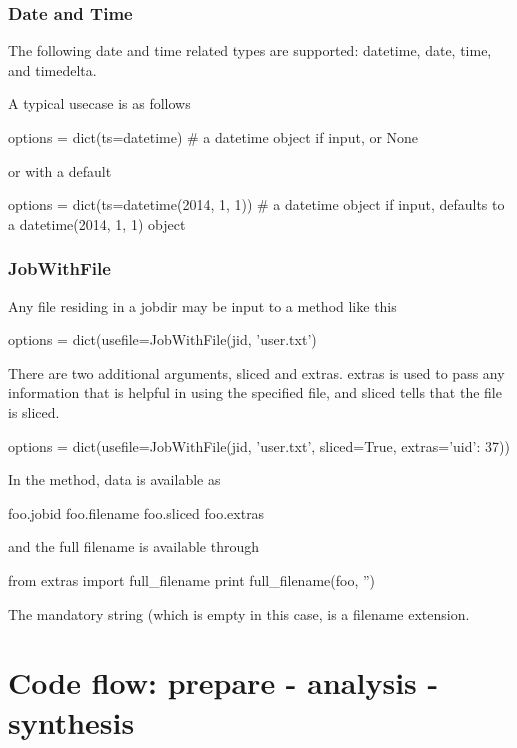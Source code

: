 \subsubsection*{Date and Time}
The following date and time related types are supported:
datetime, date, time, and timedelta.

A typical usecase is as follows

\begin{python}
options = dict(ts=datetime)
# a datetime object if input, or None
\end{python}
or with a default

\begin{python}
options = dict(ts=datetime(2014, 1, 1))
#  a datetime object if input, defaults to a datetime(2014, 1, 1) object
\end{python}



\subsubsection*{JobWithFile}
Any file residing in a jobdir may be input to a method like this

\begin{python}
options = dict(usefile=JobWithFile(jid, 'user.txt')
\end{python}

There are two additional arguments, sliced and extras.  extras is used
to pass any information that is helpful in using the specified file,
and sliced tells that the file is sliced.

\begin{python}
options = dict(usefile=JobWithFile(jid, 'user.txt', sliced=True, extras={'uid': 37}))
\end{python}
In the method, data is available as

\begin{python}
  foo.jobid
  foo.filename
  foo.sliced
  foo.extras
\end{python}
and the full filename is available through

\begin{python}
from extras import full_filename
print full_filename(foo, '')
\end{python}
The mandatory string (which is empty in this case, is a filename
extension.







\newpage
\section{Code flow:  prepare - analysis - synthesis}

